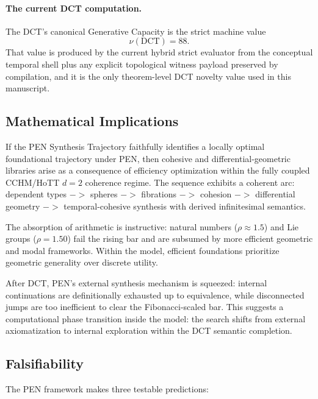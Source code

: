 \documentclass[11pt,a4paper]{article}
\def\to{->}%
\theoremstyle{plain}
\theoremstyle{definition}
\theoremstyle{remark}
\begin{document}
\paragraph{The current DCT computation.}
The DCT's canonical Generative Capacity is the strict machine value
\[
  \nu(\mathrm{DCT}) = 88.
\]
That value is produced by the current hybrid strict evaluator from the conceptual temporal shell plus any explicit topological witness payload preserved by compilation, and it is the only theorem-level DCT novelty value used in this manuscript.

\subsection{Mathematical Implications}

If the PEN Synthesis Trajectory faithfully identifies a locally optimal foundational trajectory under PEN, then cohesive and differential-geometric libraries arise as a consequence of efficiency optimization within the fully coupled CCHM/HoTT $d = 2$ coherence regime.
The sequence exhibits a coherent arc: dependent types $\to$ spheres $\to$ fibrations $\to$ cohesion $\to$ differential geometry $\to$ temporal-cohesive synthesis with derived infinitesimal semantics.

The absorption of arithmetic is instructive: natural numbers ($\rho \approx 1.5$) and Lie groups ($\rho = 1.50$) fail the rising bar and are subsumed by more efficient geometric and modal frameworks.
Within the model, efficient foundations prioritize geometric generality over discrete utility.

After DCT, PEN's external synthesis mechanism is squeezed: internal continuations are definitionally exhausted up to equivalence, while disconnected jumps are too inefficient to clear the Fibonacci-scaled bar.
This suggests a computational phase transition inside the model: the search shifts from external axiomatization to internal exploration within the DCT semantic completion.

\subsection{Falsifiability}

The PEN framework makes three testable predictions:
\end{document}
